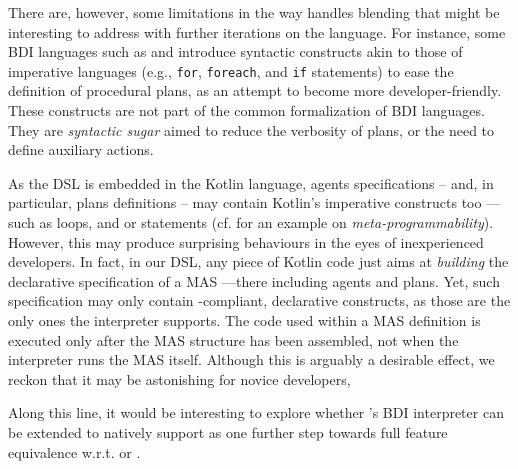 There are, however, some limitations in the way \jakta{}
handles blending that might be interesting to address with further iterations on the language.
%
For instance, some \acs{BDI} languages such as \jason{} and \astra{}
introduce syntactic constructs akin to those of imperative languages
(e.g., \texttt{for}, \texttt{foreach}, and \texttt{if} statements)
to ease the definition of procedural plans,
as an attempt to become more developer-friendly.
%
These constructs are not part of the common formalization of \ac{BDI} languages.
%
They are \textit{syntactic sugar} aimed to reduce the verbosity of plans,
or the need to define auxiliary actions.

As the \jakta{} \acs{DSL} is embedded in the Kotlin language,
agents specifications
-- and, in particular, plans definitions --
may contain Kotlin's imperative constructs too%
---such as  loops, and  or  statements
(cf.  for an example on \emph{meta-programmability}).
%
However, this may produce surprising behaviours in the eyes of inexperienced developers.
%
In fact,
in our \acs{DSL},
any piece of Kotlin code just aims at \emph{building} the declarative specification of a \acs{MAS}%
---there including agents and plans.
%
Yet, such specification may only contain \agentspeak{}-compliant, declarative constructs,
as those are the only ones the \jakta{} interpreter supports.
%
The code used within a \acs{MAS} definition is executed only after
the \acs{MAS} structure has been assembled,
not when the interpreter runs the \acs{MAS} itself.
%
Although this is arguably a desirable effect,
we reckon that it may be astonishing for novice developers,

Along this line,
it would be interesting to explore whether
\jakta{}'s \acs{BDI} interpreter can be extended to natively support
as one further step towards full feature equivalence w.r.t. \jason{} or \astra{}.


